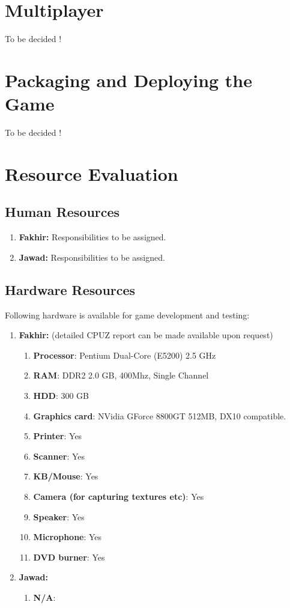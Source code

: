 \documentclass[10pt]{report}
\theoremstyle{definition}
\theoremstyle{remark}
\begin{document}
\chapter{Multiplayer}
To be decided !


\chapter{Packaging and Deploying the Game}
To be decided !

\appendix

\chapter{Resource Evaluation}

\section{Human Resources}
\begin{enumerate}
\item \textbf{Fakhir:} Responsibilities to be assigned.
\item \textbf{Jawad:} Responsibilities to be assigned.
\end{enumerate}

\section{Hardware Resources}
Following hardware is available for game development and testing:
\begin{enumerate}
\item \textbf{Fakhir:} (detailed CPUZ report can be made available upon request)
    \begin{enumerate}
    \item \textbf{Processor}: Pentium Dual-Core (E5200) 2.5 GHz
    \item \textbf{RAM}: DDR2 2.0 GB, 400Mhz, Single Channel
    \item \textbf{HDD}: 300 GB
    \item \textbf{Graphics card}: NVidia GForce 8800GT 512MB, DX10 compatible.
    \item \textbf{Printer}: Yes
    \item \textbf{Scanner}: Yes
    \item \textbf{KB/Mouse}: Yes
    \item \textbf{Camera (for capturing textures etc)}: Yes
    \item \textbf{Speaker}: Yes
    \item \textbf{Microphone}: Yes
    \item \textbf{DVD burner}: Yes
    \end{enumerate}

\item \textbf{Jawad:}
    \begin{enumerate}
    \item \textbf{N/A}:
    \end{enumerate}
\end{enumerate}
\end{document}

